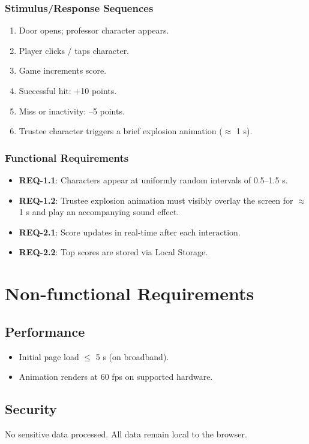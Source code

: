 \documentclass[11pt]{scrreprt}
\begin{document}
\subsection{Stimulus/Response Sequences}
\begin{enumerate}
  \item Door opens; professor character appears.
  \item Player clicks / taps character.
  \item Game increments score.
  \item Successful hit: +10 points.
  \item Miss or inactivity: –5 points.
  \item Trustee character triggers a brief explosion animation ($\approx$ 1 s).
\end{enumerate}

\subsection{Functional Requirements}
\begin{itemize}
  \item \textbf{REQ-1.1}: Characters appear at uniformly random intervals of 0.5–1.5 s.
  \item \textbf{REQ-1.2}: Trustee explosion animation must visibly overlay the screen for $\approx$ 1 s and play an accompanying sound effect.
  \item \textbf{REQ-2.1}: Score updates in real-time after each interaction.
  \item \textbf{REQ-2.2}: Top scores are stored via Local Storage.
\end{itemize}

\chapter{Non-functional Requirements}

\section{Performance}
\begin{itemize}
  \item Initial page load $\leq$ 5 s (on broadband).
  \item Animation renders at 60 fps on supported hardware.
\end{itemize}

\section{Security}
No sensitive data processed. All data remain local to the browser.
\end{document}

